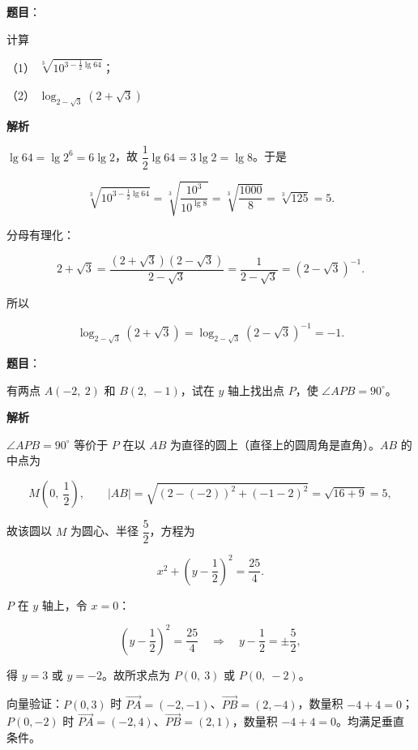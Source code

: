 \begin{answer}

\textbf{题目}：

计算

（1） $\sqrt[3]{10^{3-\frac{1}{2}\lg 64}}$；

（2） $\log_{2-\sqrt{3}}\left(2+\sqrt{3}\right)$

\textbf{解析}


$\lg64=\lg2^{6}=6\lg2$，故 $\dfrac{1}{2}\lg64=3\lg2=\lg8$。于是

\nopagebreak[4]
\[
\sqrt[3]{10^{3-\frac{1}{2}\lg64}}
=\sqrt[3]{\frac{10^{3}}{10^{\lg8}}}
=\sqrt[3]{\frac{1000}{8}}
=\sqrt[3]{125}=5.
\]


分母有理化：

\nopagebreak[4]
\[
2+\sqrt{3}=\frac{(2+\sqrt{3})(2-\sqrt{3})}{2-\sqrt{3}}=\frac{1}{2-\sqrt{3}}=\left(2-\sqrt{3}\right)^{-1}.
\]

所以

\nopagebreak[4]
\[
\log_{2-\sqrt{3}}\left(2+\sqrt{3}\right)=\log_{2-\sqrt{3}}\left(2-\sqrt{3}\right)^{-1}=-1.
\]



\end{answer}
\begin{answer}

\textbf{题目}：

有两点 $A(-2,\ 2)$ 和 $B(2,\ -1)$，试在 $y$ 轴上找出点 $P$，使 $\angle APB=90^{\circ}$。

\textbf{解析}

$\angle APB=90^{\circ}$ 等价于 $P$ 在以 $AB$ 为直径的圆上（直径上的圆周角是直角）。$AB$ 的中点为

\nopagebreak[4]
\[
M\left(0,\ \frac{1}{2}\right),
\qquad
|AB|=\sqrt{(2-(-2))^{2}+(-1-2)^{2}}=\sqrt{16+9}=5,
\]

故该圆以 $M$ 为圆心、半径 $\dfrac{5}{2}$，方程为

\nopagebreak[4]
\[
x^{2}+\left(y-\frac{1}{2}\right)^{2}=\frac{25}{4}.
\]

$P$ 在 $y$ 轴上，令 $x=0$：

\nopagebreak[4]
\[
\left(y-\frac{1}{2}\right)^{2}=\frac{25}{4}
\quad\Longrightarrow\quad
y-\frac{1}{2}=\pm\frac{5}{2},
\]

得 $y=3$ 或 $y=-2$。故所求点为 $P(0,\ 3)$ 或 $P(0,\ -2)$。

向量验证：$P(0,3)$ 时 $\vec{PA}=(-2,-1)$、$\vec{PB}=(2,-4)$，数量积 $-4+4=0$；$P(0,-2)$ 时 $\vec{PA}=(-2,4)$、$\vec{PB}=(2,1)$，数量积 $-4+4=0$。均满足垂直条件。


\end{answer}
